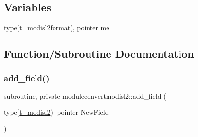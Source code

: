 \subsection*{Variables}
\begin{DoxyCompactItemize}
\item 
type(\mbox{\hyperlink{structmoduleconvertmodisl2_1_1t__modisl2format}{t\+\_\+modisl2format}}), pointer \mbox{\hyperlink{namespacemoduleconvertmodisl2_a679fc9516492ddf5d2745fc5ee6aa00f}{me}}
\end{DoxyCompactItemize}


\subsection{Function/\+Subroutine Documentation}
\mbox{\label{namespacemoduleconvertmodisl2_a133fa594d1513ec9b6ed011f318d87e8}} 
\subsubsection{\texorpdfstring{add\+\_\+field()}{add\_field()}}
{\footnotesize\ttfamily subroutine, private moduleconvertmodisl2\+::add\+\_\+field (\begin{DoxyParamCaption}\item[{type(\mbox{\hyperlink{structmoduleconvertmodisl2_1_1t__modisl2}{t\+\_\+modisl2}}), pointer}]{New\+Field }\end{DoxyParamCaption})\hspace{0.3cm}{\ttfamily [private]}}

